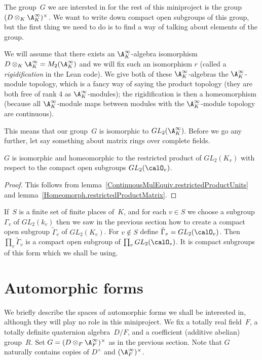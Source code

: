 The group~$G$ we are intersted in for the rest of this miniproject is the group
$(D\otimes_K\A_K^\infty)^\times$. We want to write down compact open subgroups of this group,
but the first thing we need to do is to find a way of talking about elements of the group.

We will assume that there exists an $\A_K^\infty$-algebra isomorphism
$D\otimes_K\A_K^\infty=M_2(\A_K^\infty)$ and we will fix such an isomorphism $r$
(called a \emph{rigidification} in the Lean code). We give both of these $\A_K^\infty$-algebras
the $\A_K^\infty$-module topology, which is a fancy way of saying the product topology
(they are both free of rank 4 as $\A_K^\infty$-modules); the rigidification is then
a homeomorphism (because all $\A_K^\infty$-module maps between modules with the $\A_K^\infty$-module
topology are continuous).

This means that our group~$G$ is isomorphic to $GL_2(\A_K^\infty)$. Before we go any further,
let say something about matrix rings over complete fields.

\begin{theorem} $G$ is isomorphic and homeomorphic
  to the restricted product of $GL_2(K_v)$ with respect
  to the compact open subgroups $GL_2(\calO_v)$.
\end{theorem}
\begin{proof} This follows from lemma~\ref{ContinuousMulEquiv.restrictedProductUnits}
  and lemma~\ref{Homeomorph.restrictedProductMatrix}.
\end{proof}

If~$S$ is a finite set of finite places of~$K$, and for each $v\in S$ we choose
a subgroup $\Gamma_v$ of $GL_2(k_v)$ then we saw in the previous section how to
create a compact open subgroup $\tilde{\Gamma}_v$ of $GL_2(K_v)$. For $v\notin S$
define $\tilde{\Gamma}_v=GL_2(\calO_v)$. Then $\prod_v\tilde{\Gamma}_v$ is a compact
open subgroup of $\prod_vGL_2(\calO_v)$. It is compact subgroups of this form
which we shall be using.

\section{Automorphic forms}

We briefly describe the spaces of automorphic forms we shall be interested in, although
they will play no role in this miniproject. We fix a totally real field~$F$, a
totally definite quaternion algebra~$D/F$, and a coefficient (additive abelian) group~$R$.
Set $G=(D\otimes_F\A_F^\infty)^\times$ as in the previous section. Note that $G$
naturally contains copies of $D^\times$ and $(\A_F^\infty)^\times$.

